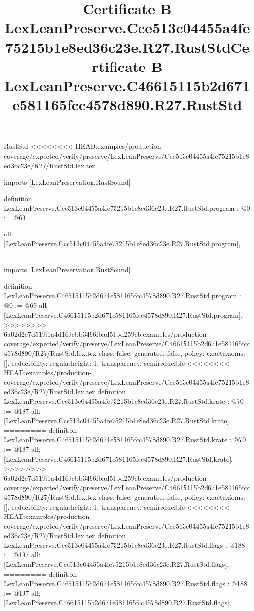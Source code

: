 \begin{lexlean}{RustStd}
<<<<<<<< HEAD:examples/production-coverage/expected/verify/preserve/LexLeanPreserve/Cce513c04455a4fe75215b1e8ed36c23e/R27/RustStd.lex.tex
\title{Certificate B LexLeanPreserve.Cce513c04455a4fe75215b1e8ed36c23e.R27.RustStd}
\begin{coremodule}
imports [LexLeanPreservation.RustSound]

definition LexLeanPreserve.Cce513c04455a4fe75215b1e8ed36c23e.R27.RustStd.program : @0 := @69 {
  all: [LexLeanPreserve.Cce513c04455a4fe75215b1e8ed36c23e.R27.RustStd.program],
========
\title{Certificate B LexLeanPreserve.C46615115b2d671e581165fcc4578d890.R27.RustStd}
\begin{coremodule}
imports [LexLeanPreservation.RustSound]

definition LexLeanPreserve.C46615115b2d671e581165fcc4578d890.R27.RustStd.program : @0 := @69 {
  all: [LexLeanPreserve.C46615115b2d671e581165fcc4578d890.R27.RustStd.program],
>>>>>>>> 6a02d2c7d519f1a4d169ebb3496fbad51bd259cb:examples/production-coverage/expected/verify/preserve/LexLeanPreserve/C46615115b2d671e581165fcc4578d890/R27/RustStd.lex.tex
  class: false,
  generated: false,
  policy: exact{axioms: []},
  reducibility: regular{height: 1},
  transparency: semireducible
}
<<<<<<<< HEAD:examples/production-coverage/expected/verify/preserve/LexLeanPreserve/Cce513c04455a4fe75215b1e8ed36c23e/R27/RustStd.lex.tex
definition LexLeanPreserve.Cce513c04455a4fe75215b1e8ed36c23e.R27.RustStd.krate : @70 := @187 {
  all: [LexLeanPreserve.Cce513c04455a4fe75215b1e8ed36c23e.R27.RustStd.krate],
========
definition LexLeanPreserve.C46615115b2d671e581165fcc4578d890.R27.RustStd.krate : @70 := @187 {
  all: [LexLeanPreserve.C46615115b2d671e581165fcc4578d890.R27.RustStd.krate],
>>>>>>>> 6a02d2c7d519f1a4d169ebb3496fbad51bd259cb:examples/production-coverage/expected/verify/preserve/LexLeanPreserve/C46615115b2d671e581165fcc4578d890/R27/RustStd.lex.tex
  class: false,
  generated: false,
  policy: exact{axioms: []},
  reducibility: regular{height: 1},
  transparency: semireducible
}
<<<<<<<< HEAD:examples/production-coverage/expected/verify/preserve/LexLeanPreserve/Cce513c04455a4fe75215b1e8ed36c23e/R27/RustStd.lex.tex
definition LexLeanPreserve.Cce513c04455a4fe75215b1e8ed36c23e.R27.RustStd.flags : @188 := @197 {
  all: [LexLeanPreserve.Cce513c04455a4fe75215b1e8ed36c23e.R27.RustStd.flags],
========
definition LexLeanPreserve.C46615115b2d671e581165fcc4578d890.R27.RustStd.flags : @188 := @197 {
  all: [LexLeanPreserve.C46615115b2d671e581165fcc4578d890.R27.RustStd.flags],
}}}
\end{coremodule}}
\end{coremodule}
\end{lexlean}
